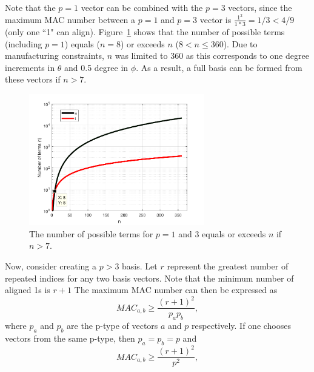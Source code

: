 \documentclass[3p,times]{elsarticle}
\begin{document}
Note that the $p=1$ vector can be combined with the $p=3$ vectors, since the maximum MAC number between a $p=1$ and $p=3$ vector is $\frac{1^2}{1*3}=1/3 < 4/9$ (only one ``1" can align).  Figure~\ref{fig:terms} shows that the number of possible terms (including $p=1$) equals ($n=8$) or exceeds $n$ ($8<n\le 360$).  Due to manufacturing constraints, $n$ was limited to 360 as this corresponds to one degree increments in $\theta$ and 0.5 degree in $\phi$.  As a result, a full basis can be formed from these vectors if $n>7$.
\begin{figure}[ht!]
\includegraphics[width={3.0in}]{../figs/TermPlot.pdf}
\centering
\caption{The number of possible terms for $p=1$ and 3 equals or exceeds $n$ if $n>7$.}
\label{fig:terms}
\end{figure}

Now, consider creating a $p>3$ basis.  Let $r$ represent the greatest number of repeated indices for any two basis vectors.  Note that the minimum number of aligned 1s is $r+1$
The maximum MAC number can then be expressed as
\begin{equation}
MAC_{a,b}\ge\frac{\left(r+1\right)^2}{p_a p_b},
\end{equation}
where $p_a$ and $p_b$ are the p-type of vectors $a$ and $p$ respectively.  If one chooses vectors from the same p-type, then $p_a=p_b=p$ and
\begin{equation}
MAC_{a,b}\ge\frac{\left(r+1\right)^2}{p^2},
\end{equation}

\end{document}
